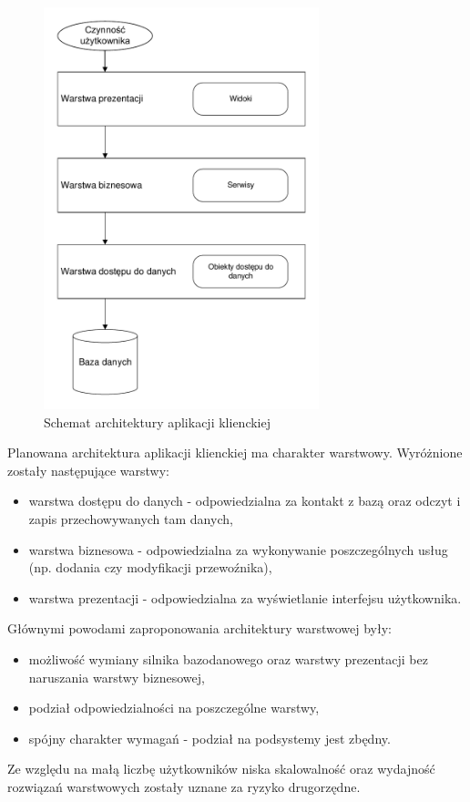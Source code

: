 \documentclass[10pt,a4paper]{article}
\begin{document}
\begin{figure}[H]
	\centering
	\includegraphics[width=8cm]{architecture-fat-client.pdf}
	\caption{Schemat architektury aplikacji klienckiej}
\end{figure}
Planowana architektura aplikacji klienckiej ma charakter warstwowy. Wyróżnione zostały następujące warstwy:
\begin{itemize}
	\item warstwa dostępu do danych - odpowiedzialna za kontakt z bazą oraz odczyt i zapis przechowywanych tam danych,
	\item warstwa biznesowa - odpowiedzialna za wykonywanie poszczególnych usług (np. dodania czy modyfikacji przewoźnika),
	\item warstwa prezentacji - odpowiedzialna za wyświetlanie interfejsu użytkownika.
	\end{itemize}
	Głównymi powodami zaproponowania architektury warstwowej były:
	\begin{itemize}
	\item możliwość wymiany silnika bazodanowego oraz warstwy prezentacji bez naruszania warstwy biznesowej,
	\item podział odpowiedzialności na poszczególne warstwy,
	\item spójny charakter wymagań - podział na podsystemy jest zbędny.
\end{itemize}
Ze względu na małą liczbę użytkowników niska skalowalność oraz wydajność rozwiązań warstwowych zostały uznane za ryzyko drugorzędne.
\end{document}
